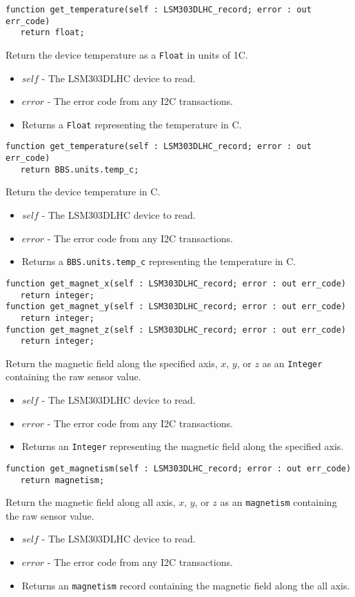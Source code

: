 \documentclass[10pt, openany]{book}
\newcommand{\datatype}[1]{\texttt{#1}}
\begin{document}
\begin{lstlisting}
function get_temperature(self : LSM303DLHC_record; error : out err_code)
   return float;
\end{lstlisting}
Return the device temperature as a \datatype{Float} in units of 1\degree{}C.
\begin{itemize}
  \item $self$ - The LSM303DLHC device to read.
  \item $error$ - The error code from any I2C transactions.
  \item Returns a \datatype{Float} representing the temperature in \degree{}C.
\end{itemize}

\begin{lstlisting}
function get_temperature(self : LSM303DLHC_record; error : out err_code)
   return BBS.units.temp_c;
\end{lstlisting}
Return the device temperature in \degree{}C.
\begin{itemize}
  \item $self$ - The LSM303DLHC device to read.
  \item $error$ - The error code from any I2C transactions.
  \item Returns a \datatype{BBS.units.temp\_c} representing the temperature in \degree{}C.
\end{itemize}

\begin{lstlisting}
function get_magnet_x(self : LSM303DLHC_record; error : out err_code)
   return integer;
function get_magnet_y(self : LSM303DLHC_record; error : out err_code)
   return integer;
function get_magnet_z(self : LSM303DLHC_record; error : out err_code)
   return integer;
\end{lstlisting}
Return the magnetic field along the specified axis, $x$, $y$, or $z$ as an \datatype{Integer} containing the raw sensor value.
\begin{itemize}
  \item $self$ - The LSM303DLHC device to read.
  \item $error$ - The error code from any I2C transactions.
  \item Returns an \datatype{Integer} representing the magnetic field along the specified axis.
\end{itemize}

\begin{lstlisting}
function get_magnetism(self : LSM303DLHC_record; error : out err_code)
   return magnetism;
\end{lstlisting}
Return the magnetic field along all axis, $x$, $y$, or $z$ as an \datatype{magnetism} containing the raw sensor value.
\begin{itemize}
  \item $self$ - The LSM303DLHC device to read.
  \item $error$ - The error code from any I2C transactions.
  \item Returns an \datatype{magnetism} record containing the magnetic field along the all axis.
\end{itemize}
\end{document}
